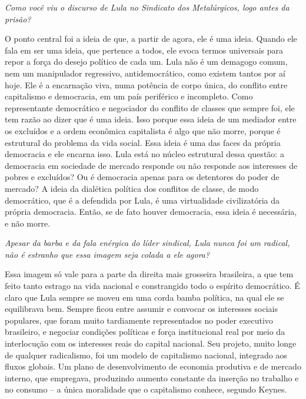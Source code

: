 \medskip

\noindent\emph{Como você viu o discurso de Lula no Sindicato dos Metalúrgicos, logo
antes da prisão?}

\noindent O ponto central foi a ideia de que, a partir de agora, ele é uma ideia.
Quando ele fala em ser uma ideia, que pertence a todos, ele evoca termos
universais para repor a força do desejo político de cada um. Lula não é
um demagogo comum, nem um manipulador regressivo, antidemocrático, como
existem tantos por aí hoje. Ele é a encarnação viva, numa potência de
corpo única, do conflito entre capitalismo e democracia, em um país
periférico e incompleto. Como representante democrático e negociador do
conflito de classes que sempre foi, ele tem razão ao dizer que é uma
ideia. Isso porque essa ideia de um mediador entre os excluídos e a
ordem econômica capitalista é algo que não morre, porque é estrutural do
problema da vida social. Essa ideia é uma das faces da própria
democracia e ele encarna isso. Lula está no núcleo estrutural dessa
questão: a democracia em sociedade de mercado responde ou não responde
aos interesses de pobres e excluídos? Ou é democracia apenas para os
detentores do poder de mercado? A ideia da dialética política dos
conflitos de classe, de modo democrático, que é a defendida por Lula, é
uma virtualidade civilizatória da própria democracia. Então, se de fato
houver democracia, essa ideia é necessária, e não morre.

\medskip

\noindent\emph{Apesar da barba e da fala enérgica do líder sindical, Lula nunca foi um
radical, não é estranho que essa imagem seja colada a ele agora?}

\noindent Essa imagem só vale para a parte da direita mais grosseira brasileira, a
que tem feito tanto estrago na vida nacional e constrangido todo o
espírito democrático. É claro que Lula sempre se moveu em uma corda
bamba política, na qual ele se equilibrava bem. Sempre ficou entre
assumir e convocar os interesses sociais populares, que foram muito
tardiamente representados no poder executivo brasileiro, e negociar
condições políticas e força institucional real por meio da interlocução
com os interesses reais do capital nacional. Seu projeto, muito longe de
qualquer radicalismo, foi um modelo de capitalismo nacional, integrado
aos fluxos globais. Um plano de desenvolvimento de economia produtiva e
de mercado interno, que empregava, produzindo aumento constante da
inserção no trabalho e no consumo -- a única moralidade que o
capitalismo conhece, segundo Keynes.

